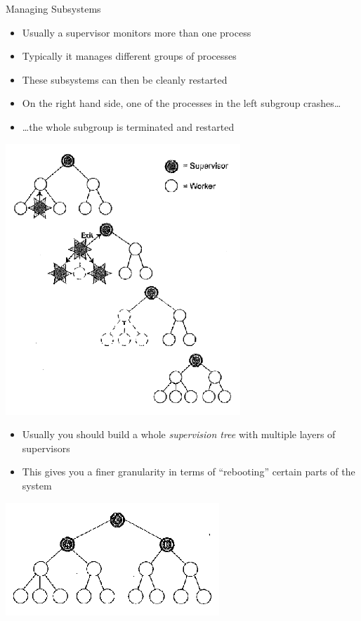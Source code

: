 \documentclass[12pt,xcolor=svgnames]{beamer}
\begin{document}
\begin{frame}{Managing Subsystems}
\begin{itemize}
\item Usually a supervisor monitors more than one process
\item Typically it manages different groups of processes
\item These subsystems can then be cleanly restarted
\item On the right hand side, one of the processes in the left subgroup crashes\dots
\item \dots the whole subgroup is terminated and restarted
\end{itemize}

\framebreak

\begin{center}
\includegraphics[scale=.55]{images/supervisor1.png}
\end{center}

\framebreak

\begin{itemize}
\item Usually you should build a whole \emph{supervision tree} with multiple layers of supervisors
\item This gives you a finer granularity in terms of ``rebooting'' certain parts of the system
\end{itemize}

\begin{center}
\includegraphics[scale=.65]{images/supervisor2.png}
\end{center}
\end{frame}
\end{document}
